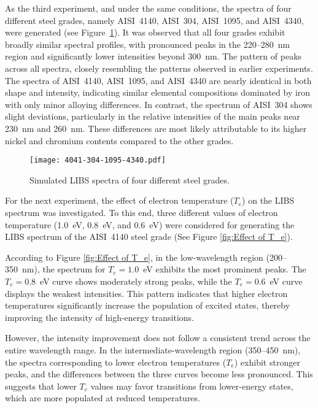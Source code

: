 \documentclass[12pt,a4paper]{article}
\begin{document}
	As the third experiment, and under the same conditions, the spectra of four different steel grades, namely AISI~4140, AISI~304, AISI~1095, and AISI~4340, were generated (see Figure~\ref{fig:4041-304-1095-4340}). 	
 	It was observed that all four grades exhibit broadly similar spectral profiles, with pronounced peaks in the 220–280~nm region and significantly lower intensities beyond 300~nm. The pattern of peaks across all spectra, closely resembling the patterns observed in earlier experiments. The spectra of AISI~4140, AISI~1095, and AISI~4340 are nearly identical in both shape and intensity, indicating similar elemental compositions dominated by iron with only minor alloying differences. In contrast, the spectrum of AISI~304 shows slight deviations, particularly in the relative intensities of the main peaks near 230~nm and 260~nm. These differences are most likely attributable to its higher nickel and chromium contents compared to the other grades. 
 	
 	
	
	\begin{figure}[h!]
		\centering
		\texttt{[image: 4041-304-1095-4340.pdf]}
		\caption{Simulated LIBS spectra of four different steel grades.}
		\label{fig:4041-304-1095-4340}
	\end{figure} 
	
	For the next experiment, the effect of electron temperature ($T_e$) on the LIBS spectrum was investigated. To this end, three different values of electron temperature (1.0~eV, 0.8~eV, and 0.6~eV) were considered for generating the LIBS spectrum of the AISI~4140 steel grade (See Figure \ref{fig:Effect of T_e}). 
	
	According to Figure \ref{fig:Effect of T_e}, in the low-wavelength region (200--350~nm), the spectrum for $T_e = 1.0$~eV exhibits the most prominent peaks. The $T_e = 0.8$~eV curve shows moderately strong peaks, while the $T_e = 0.6$~eV curve displays the weakest intensities. This pattern indicates that higher electron temperatures significantly increase the population of excited states, thereby improving the intensity of high-energy transitions. 
	
	However, the intensity improvement does not follow a consistent trend across the entire wavelength range. In the intermediate-wavelength region (350--450~nm), the spectra corresponding to lower electron temperatures ($T_e$) exhibit stronger peaks, and the differences between the three curves become less pronounced. This suggests that lower $T_e$ values may favor transitions from lower-energy states, which are more populated at reduced temperatures.
	
\end{document}
